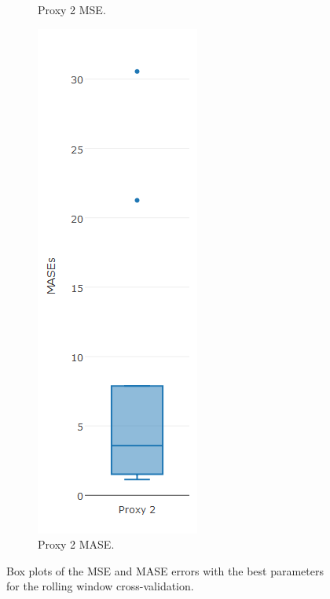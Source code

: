 \begin{figure}[!h]
{\begin{subfigure}{.25\linewidth}
  \caption{Proxy 2 MSE.}
  \label{fig:bp2.3}
\end{subfigure}
\begin{subfigure}{.25\linewidth}
  \centering
  \includegraphics[width=\linewidth]{img/10ymaMasebp.png}
  \caption{Proxy 2 MASE.}
  \label{fig:bp2.4}
\end{subfigure}}
\caption{Box plots of the MSE and MASE errors with the best parameters for the rolling window cross-validation.}
\end{figure}